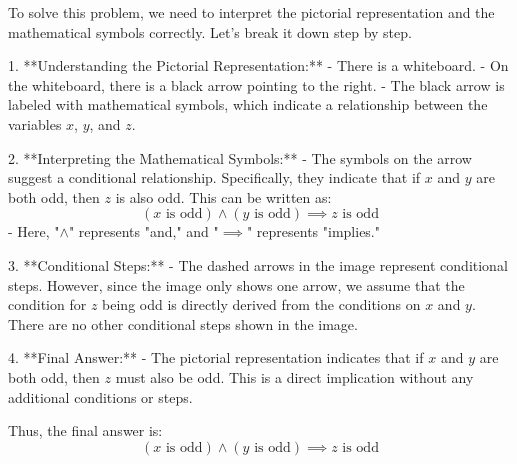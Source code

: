 To solve this problem, we need to interpret the pictorial representation and the mathematical symbols correctly. Let's break it down step by step.

1. **Understanding the Pictorial Representation:**
   - There is a whiteboard.
   - On the whiteboard, there is a black arrow pointing to the right.
   - The black arrow is labeled with mathematical symbols, which indicate a relationship between the variables \(x\), \(y\), and \(z\).

2. **Interpreting the Mathematical Symbols:**
   - The symbols on the arrow suggest a conditional relationship. Specifically, they indicate that if \(x\) and \(y\) are both odd, then \(z\) is also odd. This can be written as:
     \[
     (x \text{ is odd}) \land (y \text{ is odd}) \implies z \text{ is odd}
     \]
   - Here, "\(\land\)" represents "and," and "\(\implies\)" represents "implies."

3. **Conditional Steps:**
   - The dashed arrows in the image represent conditional steps. However, since the image only shows one arrow, we assume that the condition for \(z\) being odd is directly derived from the conditions on \(x\) and \(y\). There are no other conditional steps shown in the image.

4. **Final Answer:**
   - The pictorial representation indicates that if \(x\) and \(y\) are both odd, then \(z\) must also be odd. This is a direct implication without any additional conditions or steps.

Thus, the final answer is:
\[
\boxed{(x \text{ is odd}) \land (y \text{ is odd}) \implies z \text{ is odd}}
\]